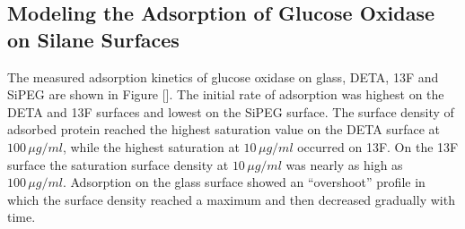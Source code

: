 \subsection{Modeling the Adsorption of Glucose Oxidase on Silane Surfaces}

The measured adsorption kinetics of glucose oxidase on glass, DETA,
13F and SiPEG are shown in Figure {[}{]}. The initial rate of adsorption
was highest on the DETA and 13F surfaces and lowest on the SiPEG surface.
The surface density of adsorbed protein reached the highest saturation
value on the DETA surface at $100\,\mu g/ml$, while the highest saturation
at $10\,\mu g/ml$ occurred on 13F. On the 13F surface the saturation
surface density at $10\,\mu g/ml$ was nearly as high as $100\,\mu g/ml$.
Adsorption on the glass surface showed an {}``overshoot'' profile
in which the surface density reached a maximum and then decreased
gradually with time. 

